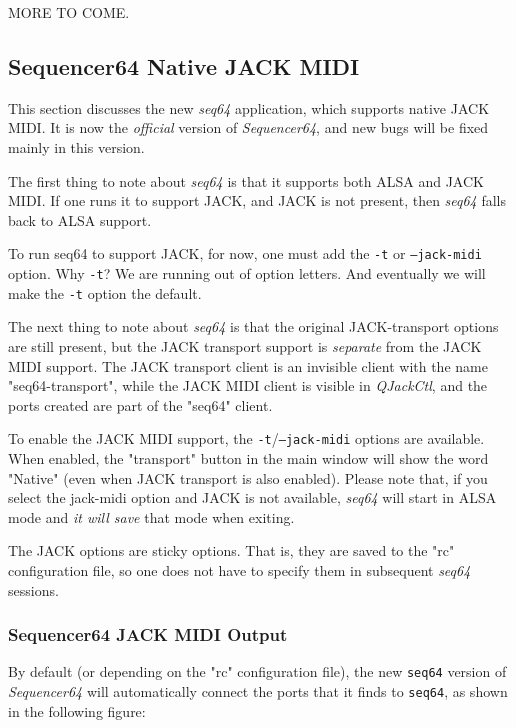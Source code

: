    MORE TO COME.

\subsection{Sequencer64 Native JACK MIDI}
\label{subsec:seq64_jack_native_midi}

   This section discusses the new \textsl{seq64} application, which supports
   native JACK MIDI.  It is now the \textsl{official} version of
   \textsl{Sequencer64}, and new bugs will be fixed mainly in this version.

   The first thing to note about \textsl{seq64}
   is that it supports both ALSA and JACK
   MIDI.  If one runs it to support JACK, and JACK is not present, then
   \textsl{seq64}
   falls back to ALSA support.

   To run seq64 to support JACK, for now, one must add the
   \texttt{-t} or \texttt{--jack-midi}
   option.  Why \texttt{-t}?  We are running out of option letters.
   And eventually we will make the \texttt{-t} option the default.

   The next thing to note about \textsl{seq64}
   is that the original JACK-transport options
   are still present, but the JACK transport support is
   \textsl{separate} from the JACK MIDI support.
   The JACK transport client is an invisible client with the
   name "seq64-transport", while the JACK MIDI client is visible in
   \textsl{QJackCtl}, and the ports created are part of the
   "seq64" client.

   To enable the JACK MIDI support, the
   \texttt{-t}/\texttt{--jack-midi} options are available.
   When enabled, the "transport" button in the main window will show the word
   "Native" (even when JACK transport is also enabled).  Please note that, if you
   select the jack-midi option and JACK is not available,
   \textsl{seq64} will start in
   ALSA mode and \textsl{it will save} that mode when exiting.

   The JACK options are sticky options.  That is, they are saved to the "rc"
   configuration file, so one does not have to specify them in subsequent
   \textsl{seq64} sessions.

\subsubsection{Sequencer64 JACK MIDI Output}
\label{subsubsec:seq64_jack_midi_output}

   By default (or depending on the "rc" configuration file), the new
   \texttt{seq64} version of \textsl{Sequencer64} will
   automatically connect the ports that it finds to \texttt{seq64},
   as shown in the following figure:

